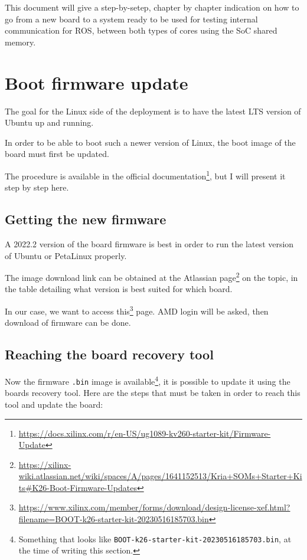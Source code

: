 \documentclass[10pt]{article}
\begin{document}
This document will give a step-by-setep, chapter by chapter indication on how to go from a new board
to a system ready to be used for testing internal communication for ROS, between both types of cores
using the SoC shared memory.

\pagebreak
\section{Boot firmware update}
\label{sec:org907cb24}
The goal for the Linux side of the deployment is to
have the latest LTS version of Ubuntu up and running.

In order to be able to boot such a newer version of Linux, the
boot image of the board must first be updated.

The procedure is available in the official documentation\footnote{\url{https://docs.xilinx.com/r/en-US/ug1089-kv260-starter-kit/Firmware-Update}},
but I will present it step by step here.

\subsection{Getting the new firmware}
\label{sec:org8b6fefb}
A 2022.2 version of the board firmware is best in order to run the latest
version of Ubuntu or PetaLinux properly.

The image download link can be obtained at the Atlassian page\footnote{\url{https://xilinx-wiki.atlassian.net/wiki/spaces/A/pages/1641152513/Kria+SOMs+Starter+Kits\#K26-Boot-Firmware-Updates}} on the topic,
in the table detailing what version is best suited for which board.

In our case, we want to access this\footnote{\url{https://www.xilinx.com/member/forms/download/design-license-xef.html?filename=BOOT-k26-starter-kit-20230516185703.bin}} page. AMD login will be asked, then
download of firmware can be done.

\subsection{Reaching the board recovery tool}
\label{sec:org6a61caa}
Now the firmware \texttt{.bin} image is available\footnote{Something that looks like \texttt{BOOT-k26-starter-kit-20230516185703.bin}, at the time of writing this section.}, it is possible to update it using the
boards recovery tool. Here are the steps that must be taken in order to reach
this tool and update the board:
\end{document}
